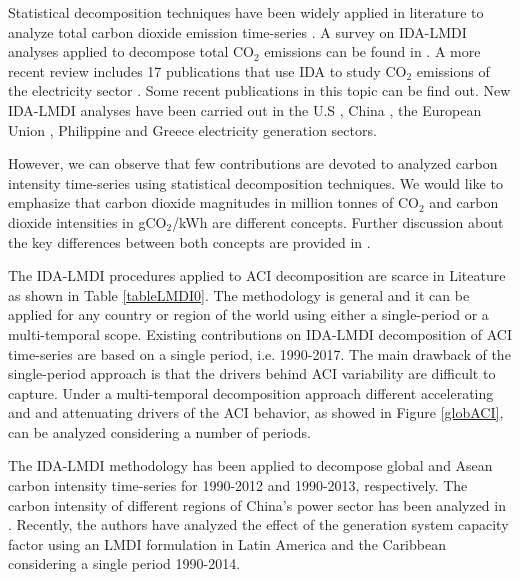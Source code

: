 \documentclass[energies,article,accept,moreauthors,12pt,a4paper]{mdpi} %
\begin{document}
Statistical decomposition techniques have been widely applied in literature to analyze total carbon dioxide emission  time-series \cite{zhang2000}.   A survey on IDA-LMDI analyses applied to decompose total CO$_2$ emissions can be found in \cite{zhang2000}. A more recent review includes 17 publications that use IDA to study CO$_2$ emissions of the electricity sector \cite{xu2013}. Some recent publications in this topic can be find out. New IDA-LMDI analyses have been carried out in the U.S \cite{jiang}, China \citep{zhao}, the European Union \cite{zkar}, Philippine \cite{sum} and Greece \cite{dia} electricity generation sectors.

 However, we can observe that few contributions are devoted to analyzed carbon intensity time-series using statistical decomposition techniques. We would like to emphasize that carbon dioxide magnitudes in million tonnes of CO$_2$ and carbon dioxide intensities  in gCO$_2$/kWh are different concepts. Further discussion about the key differences between both concepts are provided in \cite{ang2016}.
 
  The IDA-LMDI procedures applied to ACI decomposition are scarce in Liteature as shown in Table \ref{tableLMDI0}. The methodology is general and it can be applied for any country or region of the world using either a single-period or a multi-temporal scope. Existing contributions on IDA-LMDI decomposition of ACI time-series are based on a single period, i.e. 1990-2017. The main drawback of the single-period approach is that the drivers behind ACI variability are difficult to capture. Under a multi-temporal decomposition approach different accelerating and and attenuating drivers of the ACI behavior, as showed in Figure   \ref{globACI}, can be analyzed considering a number of periods.
 
 The IDA-LMDI methodology has been applied to decompose global \cite{ang2016} and Asean  \cite{goh} carbon intensity time-series for 1990-2012 and 1990-2013, respectively. The carbon intensity of different regions of China's power sector has been analyzed in \cite{peng, liu,liu2}. Recently, the authors \cite{oliv} have analyzed the effect of the generation system capacity factor using an LMDI formulation in Latin America and the Caribbean considering a single period 1990-2014. 
\end{document}
